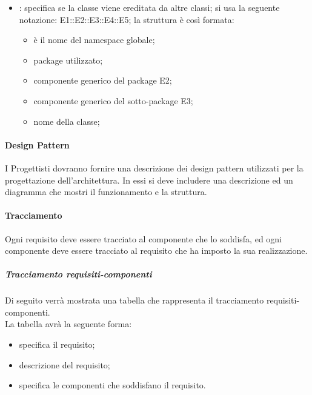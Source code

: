 \begin{itemize}
\begin{itemize}
	\end{itemize}
\item {}: specifica se la classe viene ereditata da altre classi; si usa la seguente notazione: E1::E2::E3::E4::E5; la struttura è così formata:
	\begin{itemize}
	\item {}è il nome del namespace globale;
	\item {}package utilizzato;
	\item {}componente generico del package E2;
	\item {}componente generico del sotto-package E3;
	\item {}nome della classe;
	\end{itemize}
\end{itemize}

\paragraph{Design Pattern \\}
\label{}
I Progettisti dovranno fornire una descrizione dei design pattern utilizzati per la progettazione dell'architettura. In essi si deve includere una descrizione ed un diagramma che mostri il funzionamento e la struttura.



\paragraph{Tracciamento \\}
\label{}
Ogni requisito deve essere tracciato al componente che lo soddisfa, ed ogni componente deve essere tracciato al requisito che ha imposto la sua realizzazione.

\subparagraph{Tracciamento requisiti-componenti \\}
Di seguito verrà mostrata una tabella che rappresenta il tracciamento requisiti-componenti. \\
La tabella avrà la seguente forma:
\begin{itemize}
\item {}specifica il requisito;
\item {}descrizione del requisito;
\item {}specifica le componenti che soddisfano il requisito.
\end{itemize}

